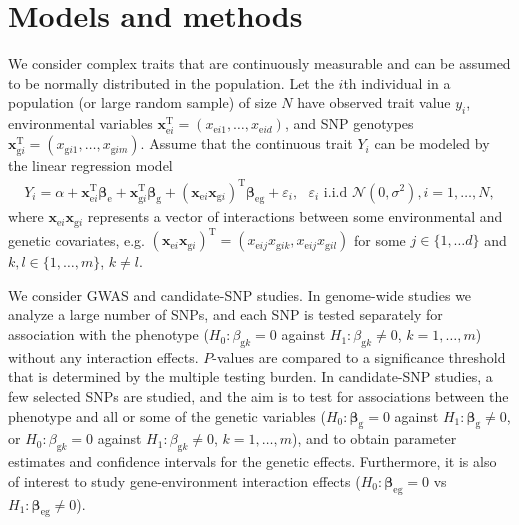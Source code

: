 \documentclass[10pt,a4paper]{article}
\def\bbetag{\bm{\beta}_{\text{g}}}
\def\betagk{\beta_{\text{g}k}}
\def\bbetae{\bm{\beta}_{\text{e}}}
\def\bbetaeg{\bm{\beta}_{\text{eg}}}
\def\bxgi{\mathbf{x}_{\text{g}i}}
\def\bxei{\mathbf{x}_{\text{e}i}}
\begin{document}
\section{Models and methods}
We consider complex traits that are continuously measurable and can be assumed to be normally distributed in the population. Let the $i$th individual in a population (or large random sample) of size $N$ have observed trait value $y_i$, environmental variables $\bxei^{\text{T}} = (x_{\text{e}i1},\ldots,x_{\text{e}id})$, and SNP genotypes $\bxgi^{\text{T}} = (x_{\text{g}i1},\ldots,x_{\text{g}im})$. Assume that the continuous trait $Y_i$ can be modeled by the linear regression model
\begin{align}
	Y_i = \alpha + \bxei^{\text{T}} \bbetae + \bxgi^{\text{T}} \bbetag + (\bxei \bxgi)^{\text{T}} \bbetaeg + \varepsilon_i, \text{ } \varepsilon_i \text{ i.i.d } \mathcal{N}(0,\sigma^2), i = 1, \ldots, N,
	\label{eq:lm}
\end{align}
where $\bxei \bxgi$ represents a vector of interactions between some environmental and genetic covariates, e.g. $(\bxei \bxgi)^{\text{T}} = (x_{\text{e}ij} x_{\text{g}ik}, x_{\text{e}ij} x_{\text{g}il})$ for some $j \in \{1,\ldots d\}$ and $k,l \in \{1,\ldots,m\}$, $k \neq l$.

We consider GWAS and candidate-SNP studies. In genome-wide studies we analyze a large number of SNPs, and each SNP is tested separately for association with the phenotype ($H_0: \betagk = 0$ against $H_1: \betagk \neq 0$, $k = 1,\ldots,m$) without any interaction effects. $P$-values are compared to a significance threshold that is determined by the multiple testing burden. In candidate-SNP studies, a few selected SNPs are studied, and the aim is to test for associations between the phenotype and all or some of the genetic variables ($H_0: \bbetag = 0$ against $H_1: \bbetag \neq 0$, or $H_0: \betagk = 0$ against $H_1: \betagk \neq 0$, $k = 1,\ldots,m$), and to obtain parameter estimates and confidence intervals for the genetic effects. Furthermore, it is also of interest to study gene-environment interaction effects ($H_0: \bbetaeg = 0$ vs $H_1: \bbetaeg \neq 0$). %
\end{document}
